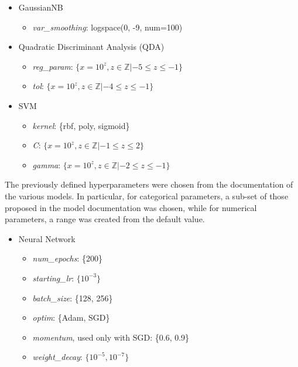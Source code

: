 \documentclass[../main]{subfiles}
\begin{document}
\begin{itemize}
    \item GaussianNB
    \begin{itemize}
        \item \textit{var\_smoothing}: logspace(0, -9, num=100)
    \end{itemize}
    \item Quadratic Discriminant Analysis (QDA)
    \begin{itemize}
        \item \textit{reg\_param}: $\{x = 10^z, z \in \mathbb{Z}|-5 \leq z \leq -1\}$
        \item \textit{tol}: $\{x = 10^z, z \in \mathbb{Z}|-4 \leq z \leq -1\}$
    \end{itemize}
\end{itemize}

\begin{itemize}
    \item SVM
    \begin{itemize}
        \item \textit{kernel}: \{rbf, poly, sigmoid\}
        \item \textit{C}: $\{x = 10^z, z \in \mathbb{Z}|-1 \leq z \leq 2\}$
        \item \textit{gamma}: $\{x = 10^z, z \in \mathbb{Z}|-2 \leq z \leq -1\}$
    \end{itemize}
\end{itemize}
\newpage
The previously defined hyperparameters were chosen from the documentation of the various models.
In particular, for categorical parameters, a sub-set of those proposed in the model documentation was chosen, while for numerical parameters, a range was created from the default value.
\begin{itemize}
    \item Neural Network
    \begin{itemize}
        \item \textit{num\_epochs}: \{200\}
        \item \textit{starting\_lr}: $\{10^{-3}\}$
        \item \textit{batch\_size}: \{128, 256\}
        \item \textit{optim}: \{Adam, SGD\}
        \item \textit{momentum}, used only with SGD: \{0.6, 0.9\}
        \item \textit{weight\_decay}: $\{10^{-5}, 10^{-7}\}$
    \end{itemize}
\end{itemize}
\end{document}
